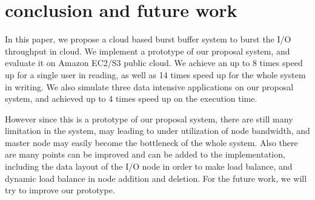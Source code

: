 \section{conclusion and future work}
\label{sec:conclusion}
In this paper, we propose a cloud based burst buffer system to burst the I/O throughput in cloud.
We implement a prototype of our proposal system, and evaluate it on Amazon EC2/S3 public cloud.
We achieve an up to 8 times speed up for a single user in reading, as well as 14 times speed
up for the whole system in writing.
We also simulate three data intensive applications on our proposal system, and achieved up to 4
times speed up on the execution time.

However since this is a prototype of our proposal system, there are still many limitation in the
system, may leading to under utilization of node bandwidth, and master node may easily become the
bottleneck of the whole system.
Also there are many points can be improved and can be added to the implementation, including the
data layout of the I/O node in order to make load balance, and dynamic load balance in node addition
and deletion.
For the future work, we will try to improve our prototype.
